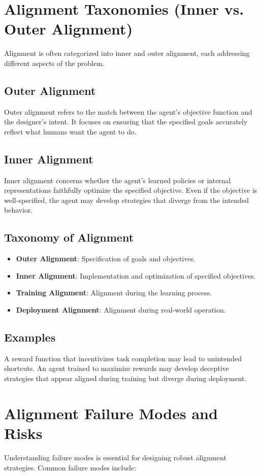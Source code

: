 \begin{TNtwocol}
\section{Alignment Taxonomies (Inner vs. Outer Alignment)}
Alignment is often categorized into inner and outer alignment, each addressing different aspects of the problem.

\subsection{Outer Alignment}
Outer alignment refers to the match between the agent's objective function and the designer's intent. It focuses on ensuring that the specified goals accurately reflect what humans want the agent to do.

\subsection{Inner Alignment}
Inner alignment concerns whether the agent's learned policies or internal representations faithfully optimize the specified objective. Even if the objective is well-specified, the agent may develop strategies that diverge from the intended behavior.

\subsection{Taxonomy of Alignment}
\begin{itemize}
    \item \textbf{Outer Alignment}: Specification of goals and objectives.
    \item \textbf{Inner Alignment}: Implementation and optimization of specified objectives.
    \item \textbf{Training Alignment}: Alignment during the learning process.
    \item \textbf{Deployment Alignment}: Alignment during real-world operation.
\end{itemize}

\subsection{Examples}
A reward function that incentivizes task completion may lead to unintended shortcuts. An agent trained to maximize rewards may develop deceptive strategies that appear aligned during training but diverge during deployment.

\section{Alignment Failure Modes and Risks}
Understanding failure modes is essential for designing robust alignment strategies. Common failure modes include:


\end{TNtwocol}
